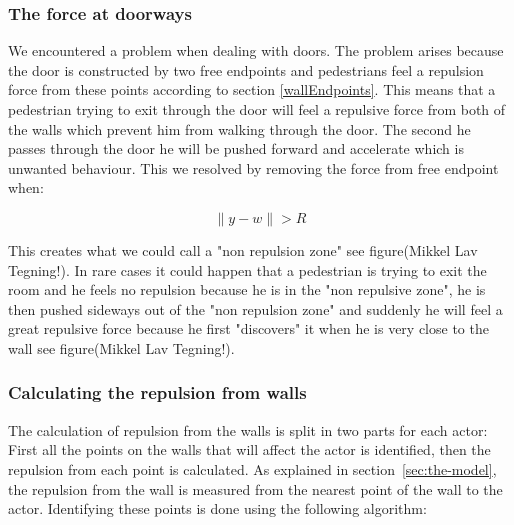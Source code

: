 \subsubsection{The force at doorways}
We encountered a problem when dealing with doors. The problem arises because 
the door is constructed by two free endpoints and pedestrians feel a repulsion 
force from these points according to section \ref{wallEndpoints}. This means 
that a pedestrian trying to exit through the door will feel a repulsive force 
from both of the walls which prevent him from walking through the door. The second he 
passes through the door he will be pushed forward and accelerate which is unwanted 
behaviour. This we resolved by removing the force from free endpoint when:

\begin{equation}
\| y - w \| > R
\end{equation}

This creates what we could call a "non repulsion zone" see figure(Mikkel Lav Tegning!).
In rare cases it could happen that a pedestrian is trying to exit the room and he feels 
no repulsion because he is in the "non repulsive zone", he is then pushed sideways out 
of the "non repulsion zone" and suddenly he will feel a great repulsive force because 
he first "discovers" it when he is very close to the wall see figure(Mikkel Lav Tegning!).

\subsubsection{Calculating the repulsion from walls}
The calculation of repulsion from the walls is split in two parts for each 
actor: First all the points on the walls that will affect the actor is 
identified, then the repulsion from each point is calculated. As explained in 
section~\ref{sec:the-model}, the repulsion from the wall is measured from the 
nearest point of the wall to the actor. Identifying these points is done using 
the following algorithm:


